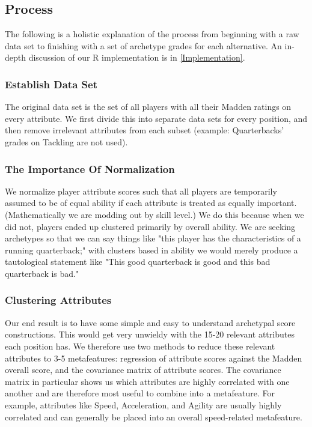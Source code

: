 \documentclass[11pt]{article}
\begin{document}
\subsection{Process}

The following is a holistic explanation of the process from beginning with a raw data set to finishing with a set of archetype grades for each alternative. An in-depth discussion of our R implementation is in \ref{Implementation}.

\subsubsection{Establish Data Set}
The original data set is the set of all players with all their Madden ratings on every attribute. We first divide this into separate data sets for every position, and then remove irrelevant attributes from each subset (example: Quarterbacks' grades on Tackling are not used).
\subsubsection{The Importance Of Normalization}
We normalize player attribute scores such that all players are temporarily assumed to be of equal ability if each attribute is treated as equally important. (Mathematically we are modding out by skill level.)  We do this because when we did not, players ended up clustered primarily by overall ability. We are seeking archetypes so that we can say things like "this player has the characteristics of a running quarterback;" with clusters based in ability we would merely produce a tautological statement like "This good quarterback is good and this bad quarterback is bad." 
\subsubsection{Clustering Attributes}
Our end result is to have some simple and easy to understand archetypal score constructions. This would get very unwieldy with the 15-20 relevant attributes each position has. We therefore use two methods to reduce these relevant attributes to 3-5 metafeatures: regression of attribute scores against the Madden overall score, and the covariance matrix of attribute scores. The covariance matrix in particular shows us which attributes are highly correlated with one another and are therefore most useful to combine into a metafeature. For example, attributes like Speed, Acceleration, and Agility are usually highly correlated and can generally be placed into an overall speed-related metafeature.
\end{document}
